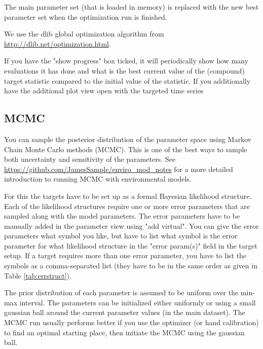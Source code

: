 \documentclass[11pt]{article}
\theoremstyle{definition}
\begin{document}
The main parameter set (that is loaded in memory) is replaced with the new best parameter set when the optimization run is finished.

We use the dlib global optimization algorithm from \url{http://dlib.net/optimization.html}.

If you have the "show progress" box ticked, it will periodically show how many evaluations it has done and what is the best current value of the (compound) target statistic compared to the initial value of the statistic. If you additionally have the additional plot view open with the targeted time series

\subsection{MCMC}\label{sec:mcmc}
You can sample the posterior distribution of the parameter space using Markov Chain Monte Carlo methods (MCMC). This is one of the best ways to sample both uncertainty and sensitivity of the parameters. See \url{https://github.com/JamesSample/enviro_mod_notes} for a more detailed introduction to running MCMC with environmental models.

For this the targets have to be set up as a formal Bayesian likelihood structure. Each of the likelihood structures require one or more error parameters that are sampled along with the model parameters. The error parameters have to be manually added in the parameter view using "add virtual". You can give the error parameters what symbol you like, but have to list what symbol is the error parameter for what likelihood structure in the "error param(s)" field in the target setup. If a target requires more than one error parameter, you have to list the symbols as a comma-separated list (they have to be in the same order as given in Table \ref{tab:errstruct}).

The prior distribution of each parameter is assumed to be uniform over the min-max interval. The parameters can be initialized either uniformly or using a small gaussian ball around the current parameter values (in the main dataset). The MCMC run usually performs better if you use the optimizer (or hand calibration) to find an optimal starting place, then initiate the MCMC using the gaussian ball.
\end{document}
